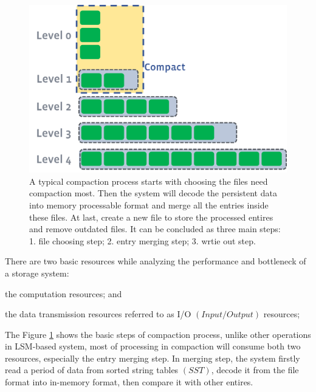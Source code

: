 \documentclass[letterpaper,twocolumn,10pt]{article}
\begin{document}
\begin{figure}
    \begin{center}
        \includegraphics[width=\columnwidth]{2018-12-24-15-28-12.png}
    \end{center}
    \caption{\label{fig:simple_compaction} A typical compaction process starts with choosing the files need compaction most. Then the system will decode the persistent data into memory processable format and merge all the entries inside these files. At last, create a new file to store the processed entires and remove outdated files. It can be concluded as three main steps: 1. file choosing step; 2. entry merging step; 3. wrtie out step.}
\end{figure}

There are two basic resources while analyzing the performance and bottleneck of a storage system:
\begin{inparaenum}[1)]
    \item the computation resources; and
    \item the data transmission resources referred to as I/O $(Input/Output)$ resources;
\end{inparaenum}
The Figure \ref{fig:simple_compaction} shows the basic steps of compaction process, unlike other operations in LSM-based system, most of processing in compaction will consume both two resources, especially the entry merging step. In merging step, the system firstly read a period of data from sorted string tables $(SST)$, decode it from the file format into in-memory format, then compare it with other entires.
\end{document}
